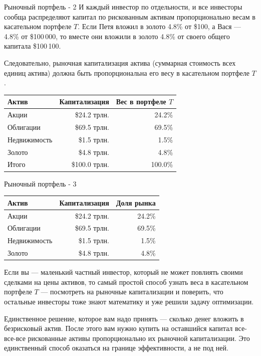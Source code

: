 \documentclass{beamer}
\begin{document}
\begin{frame}{Рыночный портфель - 2}
\justify
И каждый инвестор по отдельности, и все инвесторы сообща распределяют капитал 
по рискованным активам пропорционально весам в касательном портфеле $T$. Если 
Петя вложил в золото 4.8\% от \$100, а Вася --- 4.8\% от \$100\,000, то вместе 
они вложили в золото 4.8\% от своего общего капитала \$100\,100.

\justify
Следовательно, рыночная капитализация актива (суммарная стоимость всех единиц 
актива) должна быть пропорциональна его весу в касательном портфеле $T$.

\justify
\centering
\begin{tabular}{l|r|r}
Актив        & Капитализация & Вес в портфеле $T$ \\ \hline
Акции        &  \$24.2 трлн. &  24.2\%             \\
Облигации    &  \$69.5 трлн. &  69.5\%             \\
Недвижимость &   \$1.5 трлн. &   1.5\%             \\
Золото       &   \$4.8 трлн. &   4.8\%             \\ \hline
Итого        & \$100.0 трлн. & 100.0\% 
\end{tabular}
\end{frame}



\begin{frame}{Рыночный портфель - 3}
\centering
\begin{tabular}{l|r|r}
Актив        & Капитализация & Доля рынка \\ \hline
Акции        &  \$24.2 трлн. &  24.2\%    \\
Облигации    &  \$69.5 трлн. &  69.5\%    \\
Недвижимость &   \$1.5 трлн. &   1.5\%    \\
Золото       &   \$4.8 трлн. &   4.8\%    
\end{tabular}

\justify
Если вы --- маленький частный инвестор, который не может повлиять своими 
сделками на цены активов, то самый простой способ узнать веса в касательном 
портфеле $T$ --- посмотреть на рыночные капитализации и поверить, что остальные 
инвесторы тоже знают математику и уже решили задачу оптимизации.

\justify
Единственное решение, которое вам надо принять --- сколько денег вложить в 
безрисковый актив. После этого вам нужно купить на оставшийся капитал
все-все-все рискованные активы пропорционально их рыночной капитализации. Это 
единственный способ оказаться на границе эффективности, а не под ней.
\end{frame}
\end{document}
